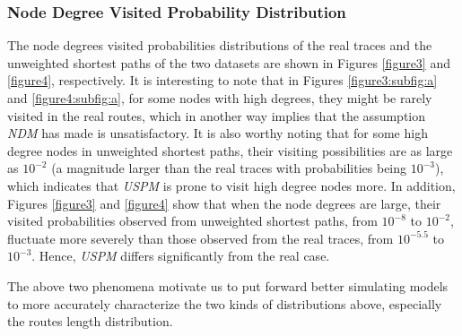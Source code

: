\documentclass[a4paper]{llncs}
\begin{document}
\subsubsection{Node Degree Visited Probability Distribution}
The node degrees visited probabilities distributions of the real
traces and the unweighted shortest paths of the two
datasets are shown in Figures \ref{figure3} and \ref{figure4},
respectively. It is interesting to note that in Figures
\ref{figure3:subfig:a} and \ref{figure4:subfig:a}, for some nodes
with high degrees, they might be rarely visited in the real routes,
which in another way implies that the assumption \textit{NDM} has made is unsatisfactory. It is also worthy noting that for some high degree nodes in unweighted shortest paths, their visiting possibilities are as large as $10^{-2}$ (a magnitude larger than the real traces with probabilities being $10^{-3}$), which indicates that \textit{USPM} is prone to visit high degree nodes more. In
addition, Figures \ref{figure3} and \ref{figure4}
show that when the node degrees are large, their visited probabilities observed from unweighted shortest paths, from $10^{-8}$
to $10^{-2}$, fluctuate more severely than those observed from the
real traces, from $10^{-5.5}$ to $10^{-3}$. Hence, \textit{USPM} differs significantly from the real case.

The above two phenomena motivate us to put forward better simulating models to more accurately characterize the two kinds of distributions above, especially the routes length distribution. 
\end{document}

